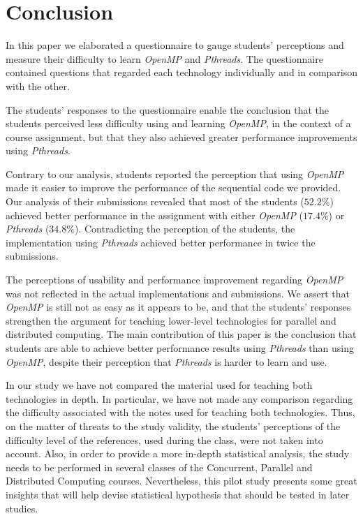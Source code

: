 \section{Conclusion}
\label{sec:conclusion}

In this paper we elaborated a questionnaire to gauge students' perceptions and
measure their difficulty to learn \textit{OpenMP} and \textit{Pthreads}.  The
questionnaire contained questions that regarded each technology individually
and in comparison with the other.

The students' responses to the questionnaire enable the conclusion that the
students perceived less difficulty using and learning \textit{OpenMP}, in the
context of a course assignment, but that they also achieved greater performance
improvements using \textit{Pthreads}.

Contrary to our analysis, students reported the perception that using
\textit{OpenMP} made it easier to improve the performance of the sequential
code we provided.  Our analysis of their submissions revealed that most 
of the students ($52.2\%$) achieved better performance in the assignment with
either \textit{OpenMP} ($17.4\%$) or \textit{Pthreads} ($34.8\%$).
Contradicting the perception of the students, the implementation using
\textit{Pthreads} achieved better performance in twice the submissions.

The perceptions of usability and performance improvement regarding
\textit{OpenMP} was not reflected in the actual implementations and
submissions. We assert that \textit{OpenMP} is still not as easy as it appears
to be, and that the students' responses strengthen the argument for teaching
lower-level technologies for parallel and distributed computing.
The main contribution of this paper is the conclusion that students
are able to achieve better performance results using \textit{Pthreads}
than using \textit{OpenMP}, despite their perception that \textit{Pthreads}
is harder to learn and use.

In our study we have not compared the material used for teaching both
technologies in depth. In particular, we have not made any comparison regarding
the difficulty associated with the notes used for teaching both technologies.
Thus, on the matter of threats to the study validity, the students' perceptions
of the difficulty level of the references, used during the class, were not
taken into account. Also, in order to provide a more in-depth statistical
analysis, the study needs to be performed in several classes of the Concurrent,
Parallel and Distributed Computing courses.  Nevertheless, this pilot study
presents some great insights that will help devise statistical hypothesis that
should be tested in later studies.

